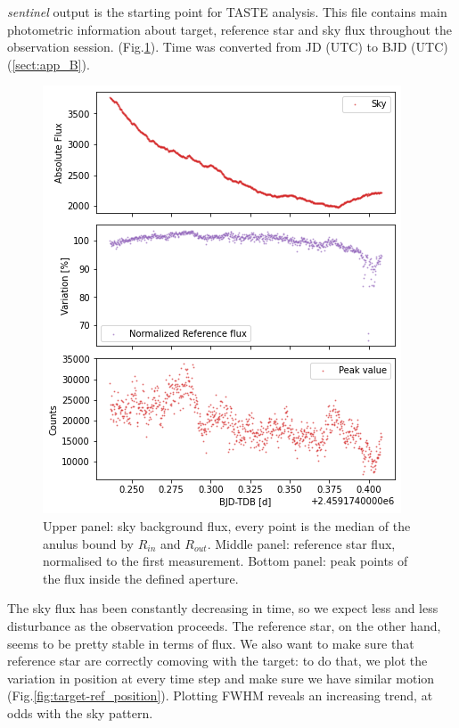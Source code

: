 \documentclass{aa}
\begin{document}
\textit{sentinel} output is the starting point for TASTE analysis. This file contains main photometric information about target, reference star and sky flux throughout the observation session. (Fig.\ref{fig:sky-ref}). Time was converted from JD (UTC) to BJD (UTC) (\ref{sect:app_B}).
\begin{figure}[h]
    \centering  
    \includegraphics[scale=0.5, angle=0]{pictures/sky-ref.png}
    \caption{Upper panel: sky background flux, every point is the median of the anulus bound by $R_{in}$ and $R_{out}$. Middle panel: reference star flux, normalised to the first measurement. Bottom panel: peak points of the flux inside the defined aperture.}
    \label{fig:sky-ref}
\end{figure}
The sky flux has been constantly decreasing in time, so we expect less and less disturbance as the observation proceeds. The reference star, on the other hand, seems to be pretty stable in terms of flux. We also want to make sure that reference star are correctly comoving with the target: to do that, 
we plot the variation in position at every time step and make sure we have similar motion (Fig.\ref{fig:target-ref_position}). Plotting FWHM reveals an increasing trend, at odds with the sky pattern.
\end{document}

